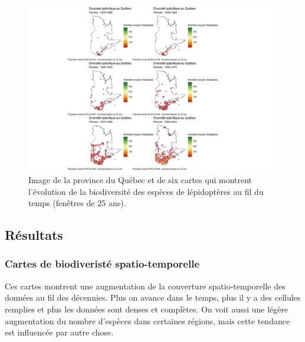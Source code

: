 \documentclass[9pt,twocolumn,twoside,]{pnas-new}
\begin{document}
\begin{figure}

\includegraphics[width=1\linewidth]{../Figures_analyse/cartes_combinees} \hfill{}

\caption{Image de la province du Québec et de six cartes qui montrent l'évolution de la biodiversité des espèces de lépidoptères au fil du temps (fenêtres de 25 ans).}\label{fig:fig_cartes_combinees, fullpage-figure}
\end{figure}

\subsection{\texorpdfstring{\textbf{Résultats}}{Résultats}}\label{ruxe9sultats}

\subsubsection{\texorpdfstring{\textbf{Cartes de biodiveristé
spatio-temporelle}}{Cartes de biodiveristé spatio-temporelle}}\label{cartes-de-biodiveristuxe9-spatio-temporelle-1}

Ces cartes montrent une augmentation de la couverture spatio-temporelle
des données au fil des décennies. Plus on avance dans le temps, plus il
y a des cellules remplies et plus les données sont denses et complètes.
On voit aussi une légère augmentation du nombre d'espèces dans certaines
régions, mais cette tendance est influencée par autre chose.
\end{document}
